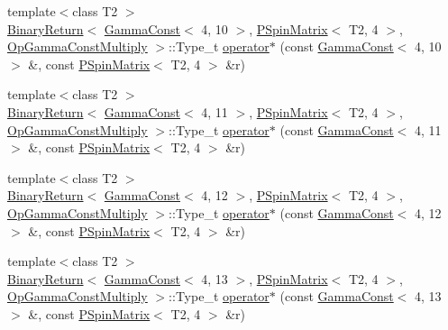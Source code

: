 \begin{DoxyCompactItemize}
\item 
{\footnotesize template$<$class T2 $>$ }\\\mbox{\hyperlink{structENSEM_1_1BinaryReturn}{Binary\+Return}}$<$ \mbox{\hyperlink{classENSEM_1_1GammaConst}{Gamma\+Const}}$<$ 4, 10 $>$, \mbox{\hyperlink{classENSEM_1_1PSpinMatrix}{P\+Spin\+Matrix}}$<$ T2, 4 $>$, \mbox{\hyperlink{structENSEM_1_1OpGammaConstMultiply}{Op\+Gamma\+Const\+Multiply}} $>$\+::Type\+\_\+t \mbox{\hyperlink{group__primspinmatrix_ga6ad402d90ca05be34ec137e28d99fded}{operator$\ast$}} (const \mbox{\hyperlink{classENSEM_1_1GammaConst}{Gamma\+Const}}$<$ 4, 10 $>$ \&, const \mbox{\hyperlink{classENSEM_1_1PSpinMatrix}{P\+Spin\+Matrix}}$<$ T2, 4 $>$ \&r)
\item 
{\footnotesize template$<$class T2 $>$ }\\\mbox{\hyperlink{structENSEM_1_1BinaryReturn}{Binary\+Return}}$<$ \mbox{\hyperlink{classENSEM_1_1GammaConst}{Gamma\+Const}}$<$ 4, 11 $>$, \mbox{\hyperlink{classENSEM_1_1PSpinMatrix}{P\+Spin\+Matrix}}$<$ T2, 4 $>$, \mbox{\hyperlink{structENSEM_1_1OpGammaConstMultiply}{Op\+Gamma\+Const\+Multiply}} $>$\+::Type\+\_\+t \mbox{\hyperlink{group__primspinmatrix_gaa5f831eba31e036c6d9d828c992751ae}{operator$\ast$}} (const \mbox{\hyperlink{classENSEM_1_1GammaConst}{Gamma\+Const}}$<$ 4, 11 $>$ \&, const \mbox{\hyperlink{classENSEM_1_1PSpinMatrix}{P\+Spin\+Matrix}}$<$ T2, 4 $>$ \&r)
\item 
{\footnotesize template$<$class T2 $>$ }\\\mbox{\hyperlink{structENSEM_1_1BinaryReturn}{Binary\+Return}}$<$ \mbox{\hyperlink{classENSEM_1_1GammaConst}{Gamma\+Const}}$<$ 4, 12 $>$, \mbox{\hyperlink{classENSEM_1_1PSpinMatrix}{P\+Spin\+Matrix}}$<$ T2, 4 $>$, \mbox{\hyperlink{structENSEM_1_1OpGammaConstMultiply}{Op\+Gamma\+Const\+Multiply}} $>$\+::Type\+\_\+t \mbox{\hyperlink{group__primspinmatrix_gac3b96a9e74f7c7170ae4c2713382e011}{operator$\ast$}} (const \mbox{\hyperlink{classENSEM_1_1GammaConst}{Gamma\+Const}}$<$ 4, 12 $>$ \&, const \mbox{\hyperlink{classENSEM_1_1PSpinMatrix}{P\+Spin\+Matrix}}$<$ T2, 4 $>$ \&r)
\item 
{\footnotesize template$<$class T2 $>$ }\\\mbox{\hyperlink{structENSEM_1_1BinaryReturn}{Binary\+Return}}$<$ \mbox{\hyperlink{classENSEM_1_1GammaConst}{Gamma\+Const}}$<$ 4, 13 $>$, \mbox{\hyperlink{classENSEM_1_1PSpinMatrix}{P\+Spin\+Matrix}}$<$ T2, 4 $>$, \mbox{\hyperlink{structENSEM_1_1OpGammaConstMultiply}{Op\+Gamma\+Const\+Multiply}} $>$\+::Type\+\_\+t \mbox{\hyperlink{group__primspinmatrix_ga704b99c9b5eb26a1b2d439a1106d809b}{operator$\ast$}} (const \mbox{\hyperlink{classENSEM_1_1GammaConst}{Gamma\+Const}}$<$ 4, 13 $>$ \&, const \mbox{\hyperlink{classENSEM_1_1PSpinMatrix}{P\+Spin\+Matrix}}$<$ T2, 4 $>$ \&r)

\end{DoxyCompactItemize}
